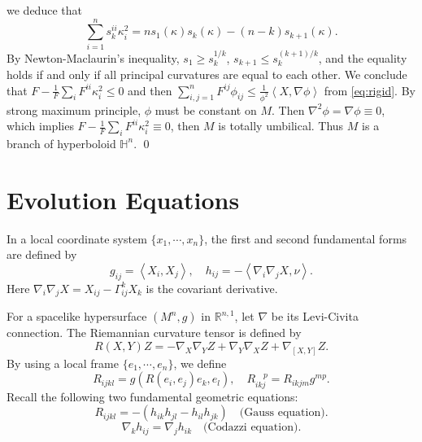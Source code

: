 \documentclass[reqno]{amsart}
\theoremstyle{remark}
\newcommand{\R}{\ensuremath{\mathbb{R}}}
\renewcommand{\H}{{\mathbb{H}}}
\newcommand{\ip}[2]{\ensuremath{\left< {#1}, {#2} \right>}}
\theoremstyle{definition}
\numberwithin{equation}{section}
\begin{document}
    we deduce that 
    \[ \sum_{i=1}^{n} s_k^{ii}\kappa_i^2 = ns_1(\kappa)s_k(\kappa) - (n-k)s_{k+1}(\kappa). \]
    By Newton-Maclaurin's inequality, \(s_1 \geq s_k^{1/k}\), \( s_{k+1} \leq s_k^{(k+1)/k} \), and the equality holds if and only if all principal curvatures are equal to each other. We conclude that \(F - \frac{1}{F}\sum_i F^{ii}\kappa_i^2 \leq 0\) and then \(\sum_{i,j=1}^{n} F^{ij}\phi_{ij} \leq \frac{1}{\phi^2}\ip{X}{\nabla \phi}\) from \eqref{eq:rigid}. By strong maximum principle, \(\phi \) must be constant on \(M\). Then \(\nabla^2\phi = \nabla \phi \equiv 0\), which implies \(F - \frac{1}{F}\sum_i F^{ii}\kappa_i^2 \equiv 0\), then \(M\) is totally umbilical. Thus \(M\) is a branch of hyperboloid \(\H^n\). 
\qed %


\section{Evolution Equations}\label{sec:evolution}
In a local coordinate system \(\{x_1,\cdots, x_n\}\), the first and second fundamental forms are defined by 
\[ g_{ij} = \ip{X_i}{X_j}, \quad h_{ij} = -\ip{\nabla_i \nabla_j X}{\nu}. \]
Here \(\nabla_i \nabla_j X = X_{ij} - \Gamma_{ij}^k  X_k\) is the covariant derivative.
\par For a spacelike hypersurface \((M^n,g)\) in \(\R^{n,1}\), let \(\nabla\) be its Levi-Civita connection. The Riemannian curvature tensor is defined by
\begin{equation}\label{eq:Riem-def}
    {R}(X,Y)Z = -\nabla_X\nabla_Y Z + \nabla_Y\nabla_X Z + \nabla_{[X,Y]}Z. 
\end{equation}
By using a local frame $\{e_1,\cdots,e_n\}$, we define 
\begin{equation}
    {R}_{ijkl} = g(R(e_i,e_j)e_k,e_l), \quad {R}_{ikj}^{\quad p} = {R}_{ikjm}g^{mp}.
\end{equation}
Recall the following two fundamental geometric equations: 
\begin{equation}\label{eq:Gauss-eq}
    R_{ijkl} = -(h_{ik}h_{jl} - h_{il}h_{jk}) \quad \text{(Gauss equation)}.
\end{equation}
\begin{equation}\label{eq:Codazzi-eq}
    \nabla_k h_{ij} = \nabla_j h_{ik} \quad \text{(Codazzi equation)}.
\end{equation}
\end{document}
